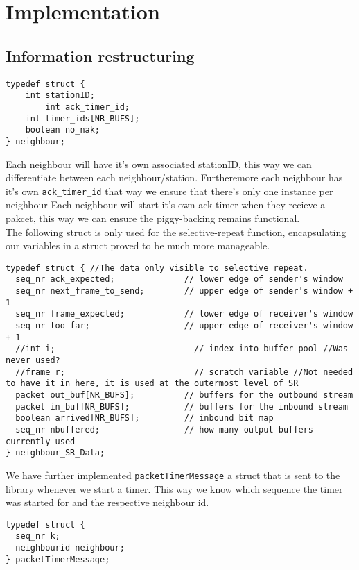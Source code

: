 \section{Implementation}
\subsection{Information restructuring}

\begin{lstlisting}
typedef struct {
    int stationID;
		int ack_timer_id;
    int timer_ids[NR_BUFS];
    boolean no_nak;
} neighbour;
\end{lstlisting}

Each neighbour will have it's own associated stationID,
this way we can differentiate between each neighbour/station.
Furtheremore each neighbour has it's own \texttt{ack\_timer\_id} that way we ensure that there's only one instance per neighbour
Each neighbour will start it's own ack timer when they recieve a pakcet,
this way we can ensure the piggy-backing remains functional.
\\

The following struct is only used for the selective-repeat function,
encapsulating our variables in a struct proved to be much more manageable.

\begin{lstlisting}
typedef struct { //The data only visible to selective repeat.
  seq_nr ack_expected;              // lower edge of sender's window
  seq_nr next_frame_to_send;        // upper edge of sender's window + 1
  seq_nr frame_expected;            // lower edge of receiver's window
  seq_nr too_far;                   // upper edge of receiver's window + 1
  //int i;                            // index into buffer pool //Was never used?
  //frame r;                          // scratch variable //Not needed to have it in here, it is used at the outermost level of SR
  packet out_buf[NR_BUFS];          // buffers for the outbound stream
  packet in_buf[NR_BUFS];           // buffers for the inbound stream
  boolean arrived[NR_BUFS];         // inbound bit map
  seq_nr nbuffered;                 // how many output buffers currently used
} neighbour_SR_Data;
\end{lstlisting}


We have further implemented \texttt{packetTimerMessage} a struct that is sent to the library whenever we start a timer.
This way we know which sequence the timer was started for and the respective neighbour id.
\begin{lstlisting}
typedef struct {
  seq_nr k;
  neighbourid neighbour;
} packetTimerMessage;
\end{lstlisting}


